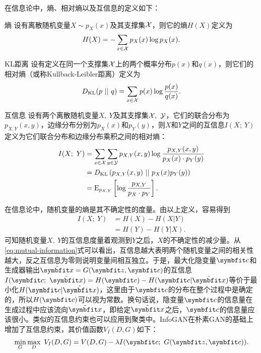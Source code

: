 在信息论中，熵、相对熵以及互信息的定义如下\citep{cover2012elements}：
\begin{definition}{熵}
  设有离散随机变量$X \sim p_X(x)$及其支撑集$\mathcal{X}$，则它的熵$H(X)$定义为
  \begin{equation}
    H(X) = -\sum_{x\in\mathcal{X}} p_X(x) \log p_X(x).
  \end{equation}
  \label{def:entropy}
\end{definition}
\begin{definition}{KL距离}
  设有定义在同一个支撑集$\mathcal{X}$上的两个概率分布$p(x)$和$q(x)$，则它们的相对熵（或称Kullback-Leibler距离）定义为
  \begin{equation}
    D_{\text{KL}}(p~||~q) = \sum_{x\in\mathcal{X}} p(x)\log \frac{p(x)}{q(x)}.
  \end{equation}
  \label{def:relative-entropy}
\end{definition}
\begin{definition}{互信息}
  设有两个离散随机变量$X,~Y$及其支撑集$\mathcal{X},~\mathcal{Y}$，它们的联合分布为$p_{X,Y}(x, y)$，边缘分布分别为$p_X(x)$和$p_Y(y)$，则$X$和$Y$之间的互信息$I(X;~Y)$定义为它们联合分布和边缘分布乘积之间的相对熵：
  \begin{equation}
    \begin{split}
      I(X;~Y) &= \sum_{x\in\mathcal{X}}\sum_{y\in\mathcal{Y}} 
      p_{X,Y}(x,y) \log\frac{p_{X,Y}(x,y)}{p_X(x) \cdot p_Y(y)}  \\
            &= D_{\text{KL}}\left( p_{X,Y}(x,y)~||~p_X(x) p_Y(y) \right) \\
            &= \text{E}_{p_{X,Y}} \left[ 
              \log\frac{p_{X,Y}}{p_X \cdot p_Y}
              \right].
    \end{split}
    \label{eq:mutual-information}
  \end{equation}
  \label{def:mutual-information}
\end{definition}

在信息论中，随机变量的熵是其不确定性的度量。由以上定义，容易得到
\begin{equation}
  \begin{split}
    I(X;~Y) &= H(X) - H(X|Y) \\
    &= H(Y) - H(Y|X).
  \end{split}
\end{equation}
可知随机变量$X,~Y$的互信息度量着观测到$Y$之后，$X$的不确定性的减少量。从\eqref{eq:mutual-information}式可以看出，互信息越大表明两个随机变量之间的相关性越大，反之互信息为零则说明变量间相互独立。于是，最大化隐变量$\bd{c}$和生成器输出$\tilde{\bd{x}} = G(\bd{z}, \bd{c})$的互信息$I(\bd{c}; ~\tilde{\bd{x}}) = H(\bd{c}) - H(\bd{c}|\tilde{\bd{x}})$等价于最小化$H(\bd{c}|\tilde{\bd{x}})$，这里由于$\bd{c}$的分布在整个过程中是确定的，所以$H(\bd{c})$可以视为常数。换句话说，隐变量$\bd{c}$的信息量在生成过程中应该流向$\tilde{\bd{x}}$，即给定$\tilde{\bd{x}}$之后，$\bd{c}$的信息量应该很小。类似的互信息约束也可以应用到聚类中\citep{bridle1992unsupervised,barber2006kernelized,krause2010discriminative}。InfoGAN在朴素GAN的基础上增加了互信息约束，其价值函数$V_I(D,G)$如下：
\begin{equation}
  \min_G\max_D ~V_I(D,G) = V(D,G) - \lambda I(\bd{c};~G(\bd{z},\bd{c})).
\end{equation}


